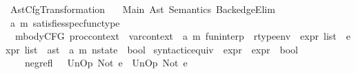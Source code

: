 %
\begin{isabellebody}%
%
%
\isadelimdocument
%
\endisadelimdocument
%
\isatagdocument
%
\isamarkuptrue%
%
\endisatagdocument
{\isafolddocument}%
%
\isadelimdocument
%
\endisadelimdocument
%
\isadelimtheory
%
\endisadelimtheory
%
\isatagtheory
{}\isamarkupfalse%
\ Ast{\isacharunderscore}{\kern0pt}Cfg{\isacharunderscore}{\kern0pt}Transformation\isanewline
\ \ \ Main\ Ast\ Semantics\ BackedgeElim\isanewline
{}%
\endisatagtheory
{\isafoldtheory}%
%
\isadelimtheory
\isanewline
%
\endisadelimtheory
\isanewline
{}\isamarkupfalse%
\ {\isacharparenleft}{\kern0pt}{\isacharprime}{\kern0pt}a{\isacharcomma}{\kern0pt}\ {\isacharprime}{\kern0pt}m{\isacharparenright}{\kern0pt}\ satisfies{\isacharunderscore}{\kern0pt}spec{\isacharunderscore}{\kern0pt}func{\isacharunderscore}{\kern0pt}type\ {\isacharequal}{\kern0pt}\ \isanewline
\ \ {\isachardoublequoteopen}mbodyCFG\ proc{\isacharunderscore}{\kern0pt}context\ {\isasymRightarrow}\ var{\isacharunderscore}{\kern0pt}context\ {\isasymRightarrow}\ {\isacharparenleft}{\kern0pt}{\isacharprime}{\kern0pt}a{\isacharcomma}{\kern0pt}\ {\isacharprime}{\kern0pt}m{\isacharparenright}{\kern0pt}\ fun{\isacharunderscore}{\kern0pt}interp\ {\isasymRightarrow}\ rtype{\isacharunderscore}{\kern0pt}env\ {\isasymRightarrow}\ expr\ list\ {\isasymRightarrow}\ expr\ list\ {\isasymRightarrow}\ ast\ {\isasymRightarrow}\ {\isacharparenleft}{\kern0pt}{\isacharprime}{\kern0pt}a{\isacharcomma}{\kern0pt}\ {\isacharprime}{\kern0pt}m{\isacharparenright}{\kern0pt}\ nstate\ {\isasymRightarrow}\ bool{\isachardoublequoteclose}%
\isadelimdocument
%
\endisadelimdocument
%
\isatagdocument
%
\isamarkuptrue%
%
\endisatagdocument
{\isafolddocument}%
%
\isadelimdocument
%
\endisadelimdocument
{}\isamarkupfalse%
\ syntactic{\isacharunderscore}{\kern0pt}equiv\ {\isacharcolon}{\kern0pt}{\isacharcolon}{\kern0pt}\ {\isachardoublequoteopen}expr\ {\isasymRightarrow}\ expr\ {\isasymRightarrow}\ bool{\isachardoublequoteclose}\ {\isacharparenleft}{\kern0pt}\ {\isachardoublequoteopen}{\isasymsim}{\isachardoublequoteclose}\ {}{}{\isacharparenright}{\kern0pt}\ \isanewline
\ \ \isanewline
\ \ \ \ neg{\isacharunderscore}{\kern0pt}refl{\isacharcolon}{\kern0pt}\ \ \ {\isachardoublequoteopen}UnOp\ Not\ e{}\ {\isasymsim}\ UnOp\ Not\ e{}{\isachardoublequoteclose}\isanewline

\end{isabellebody}
